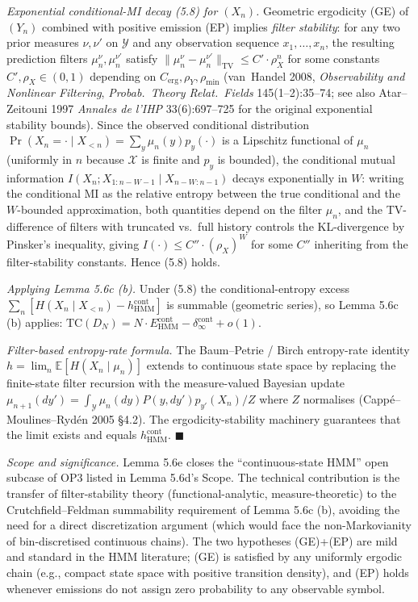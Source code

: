 \documentclass[
]{article}
\begin{document}
\emph{Exponential conditional-MI decay (5.8) for $(X_n)$.}
Geometric ergodicity (GE) of $(Y_n)$ combined with positive emission
(EP) implies \emph{filter stability}: for any two prior measures
$\nu, \nu'$ on $\mathcal{Y}$ and any observation sequence
$x_1, \ldots, x_n$, the resulting prediction filters
$\mu_n^{\nu}, \mu_n^{\nu'}$ satisfy
$\|\mu_n^{\nu} - \mu_n^{\nu'}\|_{\mathrm{TV}} \leq C' \cdot \rho_X^n$
for some constants $C', \rho_X \in (0, 1)$ depending on
$C_{\mathrm{erg}}, \rho_Y, \rho_{\min}$ (van~Handel 2008,
\emph{Observability and Nonlinear Filtering},
\emph{Probab.\ Theory Relat.\ Fields} 145(1--2):35--74; see also
Atar--Zeitouni 1997 \emph{Annales de l'IHP} 33(6):697--725 for the
original exponential stability bounds). Since the observed
conditional distribution $\Pr(X_n = \cdot \mid X_{<n}) = \sum_y \mu_n(y)
p_y(\cdot)$ is a Lipschitz functional of $\mu_n$ (uniformly in $n$
because $\mathcal{X}$ is finite and $p_y$ is bounded), the conditional
mutual information $I(X_n; X_{1:n-W-1} \mid X_{n-W:n-1})$ decays
exponentially in $W$: writing the conditional MI as the relative
entropy between the true conditional and the $W$-bounded
approximation, both quantities depend on the filter $\mu_n$, and the
TV-difference of filters with truncated vs.\ full history controls
the KL-divergence by Pinsker's inequality, giving
$I(\cdot) \leq C'' \cdot (\rho_X)^W$ for some $C''$ inheriting from
the filter-stability constants. Hence (5.8) holds.

\emph{Applying Lemma 5.6c (b).} Under (5.8) the conditional-entropy
excess $\sum_n [H(X_n \mid X_{<n}) - h_{\mathrm{HMM}}^{\mathrm{cont}}]$
is summable (geometric series), so Lemma 5.6c (b) applies: $\mathrm{TC}(D_N)
= N \cdot E_{\mathrm{HMM}}^{\mathrm{cont}} - \delta_\infty^{\mathrm{cont}}
+ o(1)$.

\emph{Filter-based entropy-rate formula.} The Baum--Petrie /
Birch entropy-rate identity $h = \lim_n \mathbb{E}[H(X_n \mid \mu_n)]$
extends to continuous state space by replacing the finite-state
filter recursion with the measure-valued Bayesian update
$\mu_{n+1}(dy') = \int_{\mathcal{Y}} \mu_n(dy) P(y, dy') p_{y'}(X_n) / Z$
where $Z$ normalises (Capp{\'e}--Moulines--Ryd{\'e}n 2005 §4.2). The
ergodicity-stability machinery guarantees that the limit exists and
equals $h_{\mathrm{HMM}}^{\mathrm{cont}}$.
\hfill$\blacksquare$

\emph{Scope and significance.} Lemma 5.6e closes the
``continuous-state HMM'' open subcase of OP3 listed in Lemma 5.6d's
Scope. The technical contribution is the transfer of filter-stability
theory (functional-analytic, measure-theoretic) to the Crutchfield--Feldman
summability requirement of Lemma 5.6c (b), avoiding the need for a
direct discretization argument (which would face the non-Markovianity
of bin-discretised continuous chains). The two hypotheses
(GE)+(EP) are mild and standard in the HMM literature; (GE) is
satisfied by any uniformly ergodic chain (e.g., compact state space
with positive transition density), and (EP) holds whenever emissions
do not assign zero probability to any observable symbol.
\end{document}
